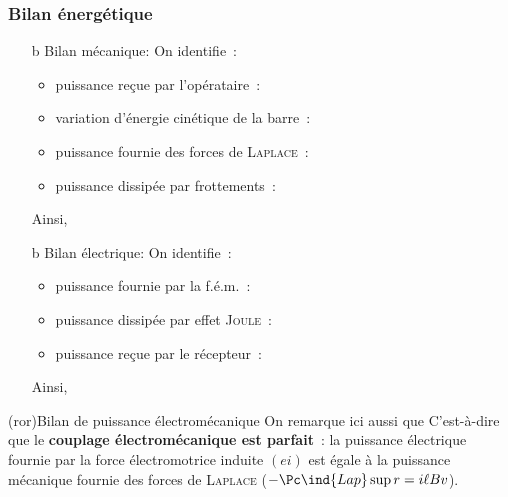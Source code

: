 \documentclass[../../main/main.tex]{subfiles}
\begin{document}
\subsubsection{Bilan énergétique}
\label{sssec:rlplgene_bilanrj}
\begin{itemize}
	\item[b]{Bilan mécanique}: %
	On identifie~:
	\begin{itemize}
		\item puissance reçue par l'opérataire~: %
		\item variation d'énergie cinétique de la barre~: %
		\item puissance fournie des forces de \textsc{Laplace}~: %
		\item puissance dissipée par frottements~: %
	\end{itemize}
	Ainsi,
	\psw{%
		\[
			\boxed{
				\Pc\ind{ope}\sup{r}
				=
				\dv{\Ec_c}{t} + \Pc_f\sup{f} + \Pc\ind{Lap}\sup{f}
			}
		\]
	}%
	\item[b]{Bilan électrique}:  On identifie~:
	\begin{itemize}
		\item puissance fournie par la f.é.m.~: %
		\item puissance dissipée par effet \textsc{Joule}~: %
		\item puissance reçue par le récepteur~: %
	\end{itemize}
	Ainsi,
	\psw{%
		\[
			\boxed{\Pc\ind{fem}\sup{f} = \Pc_J\sup{r} + \Pc_R\sup{r}}
		\]
	}%
\end{itemize}
\begin{tcb}(ror){Bilan de puissance électromécanique}
	On remarque ici aussi que
	\psw{%
		\[
			\boxed{\Pc\ind{fem}\sup{fournie} = \Pc\ind{Lap}\sup{fournie}}
		\]
	}%
	C'est-à-dire que le \textbf{couplage électromécanique est parfait}~: la
	puissance électrique fournie par la force électromotrice induite $(ei)$ est
	égale à la puissance mécanique fournie des forces de \textsc{Laplace}
	($-\Pc\ind{Lap}\sup{r} = i \ell Bv$).
\end{tcb}
\end{document}
